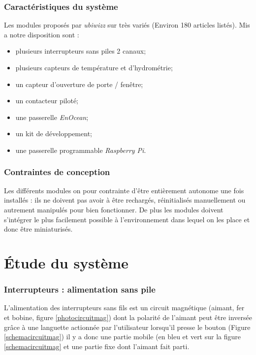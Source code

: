 \documentclass{rapportENS}
\begin{document}

 \section{Caractéristiques du système}
 
 Les modules proposés par \textit{ubiwizz} sur très variés (Environ 180 articles listés). Mis a notre disposition sont :
 \begin{itemize}
 \item plusieurs interrupteurs sans piles 2 canaux;
 \item plusieurs capteurs de température et d'hydrométrie;
 \item un capteur d'ouverture de porte / fenêtre;
 \item un contacteur piloté;
 \item une passerelle \textit{EnOcean};
 \item un kit de développement;
 \item une passerelle programmable \textit{Raspberry Pi}. 
\end{itemize}  
 
 \section{Contraintes de conception}
 
 Les différents modules on pour contrainte d'être entièrement autonome une fois installés : ils ne doivent pas avoir à être rechargés, réinitialisés manuellement ou autrement manipulés pour bien fonctionner. De plus les modules doivent s'intégrer le plus facilement possible à l'environnement dans lequel on les place et donc être miniaturisés.
 
 \part{Étude du système}
 
 \section{Interrupteurs : alimentation sans pile}
 
 L'alimentation des interrupteurs sans fils est un circuit magnétique (aimant, fer et bobine, figure \ref{photocircuitmag}) dont la polarité de l'aimant peut être inversée grâce à une languette actionnée par l'utilisateur lorsqu'il presse le bouton (Figure \ref{schemacircuitmag}) il y a donc une partie mobile (en bleu et vert sur la figure \ref{schemacircuitmag} et une partie fixe dont l'aimant fait parti.
 
\end{document}
